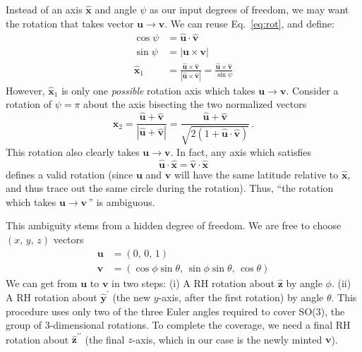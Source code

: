 \documentclass{article}
\renewcommand{\vec}[1]{\boldsymbol{#1}}
\newcommand{\vecN}[1]{\vec{\hat{#1}}}
\newcommand{\ds}{^{}}
\newcommand{\abs}[1]{|#1|}
\newcommand{\vvv}[3]{(#1,\,#2,\,#3)}
\newcommand{\ang}{\psi}
\newcommand{\ax}{\vecN{x}}
\begin{document}
Instead of an axis $\ax$ and angle $\ang$ as our input degrees of freedom,
we may want the rotation that takes vector $\vec{u}\to\vec{v}$.
We can reuse Eq.~\ref{eq:rot}, and define:
\begin{align}
	\cos\ang & = \vecN{u}\cdot\vecN{v}\\
	\sin\ang & = \abs{\vec{u}\times\vec{v}}\\
	\ax_1\ds & = \frac{\vecN{u}\times\vecN{v}}{\abs{\vecN{u}\times\vecN{v}}}
		= \frac{\vecN{u}\times\vecN{v}}{\sin\ang}\label{eq:x1}
\end{align}
However, $\ax_1\ds$ is only one \emph{possible} rotation axis which takes 
$\vec{u}\to \vec{v}$. Consider a rotation of $\ang = \pi$ 
about the axis bisecting the two normalized vectors
\begin{equation}\label{eq:x2}
	\ax_2\ds = \frac{\vecN{u} + \vecN{v}}{\abs{\vecN{u} + \vecN{v}}} 
		= \frac{\vecN{u} + \vecN{v}}{\sqrt{2(1+\vecN{u}\cdot\vecN{v})}}
	\,.
\end{equation}
This rotation also clearly takes $\vec{u}\to\vec{v}$.
In fact, any axis which satisfies 
\begin{equation}
	\vecN{u}\cdot\ax = \vecN{v}\cdot\ax
\end{equation}
defines a valid rotation (since $\vec{u}$ and $\vec{v}$ will have 
the same latitude relative to $\ax$, 
and thus trace out the same circle during the rotation).
Thus, ``the rotation which takes $\vec{u}\to\vec{v}\,$'' is ambiguous.

This ambiguity stems from a hidden degree of freedom.
We are free to choose $\vvv{x}{y}{z}$ vectors 
\begin{align}
	\vec{u} & = \vvv{0}{0}{1}\\
	\vec{v} & = \vvv{\cos \phi \sin \theta}{\sin \phi \sin \theta}{\cos\theta}
\end{align}
We can get from $\vec{u}$ to $\vec{v}$ in two steps:
(i) A RH rotation about $\vecN{z}$ by angle $\phi$.
(ii) A RH rotation about $\vecN{y}^\prime$ (the new $y$-axis, after the first rotation) by angle $\theta$.
This procedure uses only two of the three Euler angles required to 
cover SO(3), the group of 3-dimensional rotations.
To complete the coverage, we need a final RH rotation about $\vecN{z}^{\prime\prime}$ 
(the final $z$-axis, which in our case is the newly minted $\vec{v}$).
\end{document}
